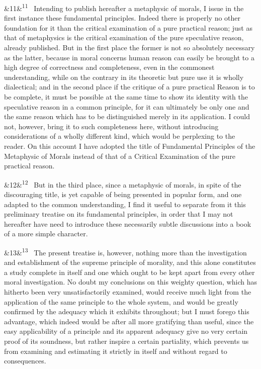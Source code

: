 \documentclass[12pt]{article}
\newcommand{\para}[1][]{\par\noindent\ifx&#1&\else\textsuperscript{\footnotesize #1}~\fi}
\begin{document}
\para[11] Intending to publish hereafter a metaphysic of morals, I issue in the first instance these fundamental principles. Indeed there is properly no other foundation for it than the critical examination of a pure practical reason; just as that of metaphysics is the critical examination of the pure speculative reason, already published. But in the first place the former is not so absolutely necessary as the latter, because in moral concerns human reason can easily be brought to a high degree of correctness and completeness, even in the commonest understanding, while on the contrary in its theoretic but pure use it is wholly dialectical; and in the second place if the critique of a pure practical Reason is to be complete, it must be possible at the same time to show its identity with the speculative reason in a common principle, for it can ultimately be only one and the same reason which has to be distinguished merely in its application. I could not, however, bring it to such completeness here, without introducing considerations of a wholly different kind, which would be perplexing to the reader. On this account I have adopted the title of Fundamental Principles of the Metaphysic of Morals instead of that of a Critical Examination of the pure practical reason.

\para[12] But in the third place, since a metaphysic of morals, in spite of the discouraging title, is yet capable of being presented in popular form, and one adapted to the common understanding, I find it useful to separate from it this preliminary treatise on its fundamental principles, in order that I may not hereafter have need to introduce these necessarily subtle discussions into a book of a more simple character.

\para[13] The present treatise is, however, nothing more than the investigation and establishment of the supreme principle of morality, and this alone constitutes a study complete in itself and one which ought to be kept apart from every other moral investigation. No doubt my conclusions on this weighty question, which has hitherto been very unsatisfactorily examined, would receive much light from the application of the same principle to the whole system, and would be greatly confirmed by the adequacy which it exhibits throughout; but I must forego this advantage, which indeed would be after all more gratifying than useful, since the easy applicability of a principle and its apparent adequacy give no very certain proof of its soundness, but rather inspire a certain partiality, which prevents us from examining and estimating it strictly in itself and without regard to consequences.
\end{document}
